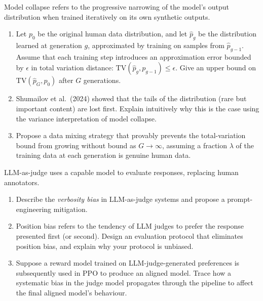 \begin{exercise}
\label{ex:model-collapse}
Model collapse refers to the progressive narrowing of the model's output distribution when trained iteratively on its own synthetic outputs.
\begin{enumerate}
  \item Let $p_0$ be the original human data distribution, and let $\hat{p}_g$ be the distribution learned at generation $g$, approximated by training on samples from $\hat{p}_{g-1}$. Assume that each training step introduces an approximation error bounded by $\epsilon$ in total variation distance: $\mathrm{TV}(\hat{p}_g, p_{g-1}) \leq \epsilon$. Give an upper bound on $\mathrm{TV}(\hat{p}_G, p_0)$ after $G$ generations.
  \item Shumailov et al.\ (2024) showed that the tails of the distribution (rare but important content) are lost first. Explain intuitively why this is the case using the variance interpretation of model collapse.
  \item Propose a data mixing strategy that provably prevents the total-variation bound from growing without bound as $G \to \infty$, assuming a fraction $\lambda$ of the training data at each generation is genuine human data.
\end{enumerate}
\end{exercise}

\begin{exercise}
\label{ex:llm-as-judge}
LLM-as-judge uses a capable model to evaluate responses, replacing human annotators.
\begin{enumerate}
  \item Describe the \emph{verbosity bias} in LLM-as-judge systems and propose a prompt-engineering mitigation.
  \item Position bias refers to the tendency of LLM judges to prefer the response presented first (or second). Design an evaluation protocol that eliminates position bias, and explain why your protocol is unbiased.
  \item Suppose a reward model trained on LLM-judge-generated preferences is subsequently used in PPO to produce an aligned model. Trace how a systematic bias in the judge model propagates through the pipeline to affect the final aligned model's behaviour.
\end{enumerate}
\end{exercise}

